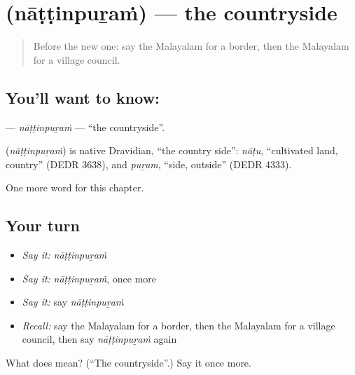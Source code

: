 \section[\texorpdfstring{\ml{നാട്ടിൻപുറം} (nāṭṭinpuṟaṁ)}{നാട്ടിൻപുറം (nāṭṭinpuṟaṁ)}]{ (nāṭṭinpuṟaṁ) — the countryside}

\label{lesson:ML-C316-nattinpuram}



\begin{quote}
Before the new one: say the Malayalam for a border, then the Malayalam for a village council.
\end{quote}

\subsection*{You'll want to know: }
\textbf{} — \emph{nāṭṭinpuṟaṁ} — \textquotedblleft{}the countryside\textquotedblright{}.

\begin{cousinweb}
\textbf{} (\emph{nāṭṭinpuṟaṁ}) is native Dravidian, \textquotedblleft{}the country side\textquotedblright{}: \emph{nāṭu}, \textquotedblleft{}cultivated land, country\textquotedblright{} (DEDR 3638), and \emph{puṟam}, \textquotedblleft{}side, outside\textquotedblright{} (DEDR 4333).
\end{cousinweb}

\begin{grammarlens}[title={What you've built}]
One more word for this chapter.
\end{grammarlens}

\subsection*{Your turn}
\begin{itemize}
\raggedright
  \item \emph{Say it:} \emph{nāṭṭinpuṟaṁ}
  \item \emph{Say it:} \emph{nāṭṭinpuṟaṁ}, once more
  \item \emph{Say it:} say \emph{nāṭṭinpuṟaṁ}
  \item \emph{Recall:} say the Malayalam for a border, then the Malayalam for a village council, then say \emph{nāṭṭinpuṟaṁ} again
\end{itemize}

\begin{tcolorbox}[breakable,colback=teal!4,colframe=teal!35!black,title={Before you move on}]
What does  mean? (\textquotedblleft{}The countryside\textquotedblright{}.) Say it once more.
\end{tcolorbox}
